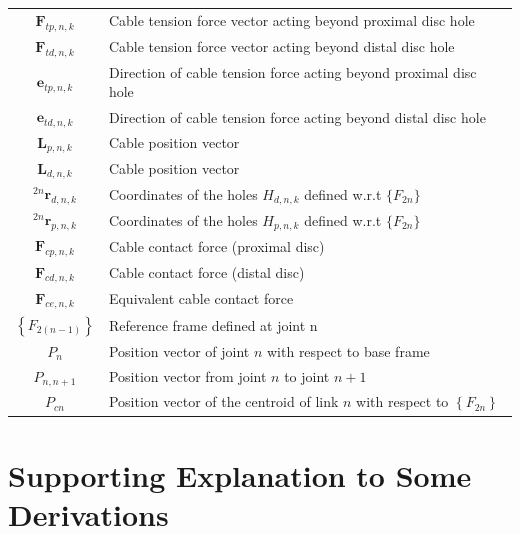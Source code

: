 \documentclass[a4paper,12pt]{report}
\begin{document}
\begin{appendices}
\begin{center}
\begin{longtable}{|c|p{12cm}|}
			$\boldsymbol{F}_{t p, n, k}$ & Cable tension force vector acting beyond proximal disc hole\\
			$\boldsymbol{F}_{t d, n, k}$ & Cable tension force vector acting beyond distal disc hole\\
			$\boldsymbol{e}_{t p, n, k}$ & Direction of cable tension force acting beyond proximal disc hole\\
			$\boldsymbol{e}_{t d, n, k}$ & Direction of cable tension force acting beyond distal disc hole\\
			
			$\boldsymbol{L}_{p, n, k}$ & Cable position vector \\
			$\boldsymbol{L}_{d, n, k}$ & Cable position vector\\
			$^{2 n}{\boldsymbol{r}_{d, n, k}}$ & Coordinates of the holes $H_{d,n,k}$ defined w.r.t $\{F_{2n}\}$ \\
			$^{2 n}{\boldsymbol{r}_{p, n, k}}$ & Coordinates of the holes $H_{p,n,k}$ defined w.r.t $\{F_{2n}\}$ \\
			
			$\boldsymbol{F}_{c p, n, k}$ & Cable contact force (proximal disc) \\
			
			$\boldsymbol{F}_{c d, n, k}$ & Cable contact force (distal disc) \\
			
			$\boldsymbol{F}_{c e, n, k}$ & Equivalent cable contact force \\
			
			$\left\{F_{2(n-1)}\right\}$ & Reference frame defined at joint n\\
			
			$P_{n}$ & Position vector of joint $n$ with respect to base frame \\
			$P_{n, n+1}$ & Position vector from joint $n$ to joint $n+1$  \\
			$P_{cn}$ & Position vector of the centroid of link $n$ with respect to $\left\{F_{2 n}\right\}$ \\              
			\hline
		\end{longtable}
		\endgroup
	\end{center}

	\chapter{Supporting Explanation to Some Derivations}

\end{appendices}
\end{document}

